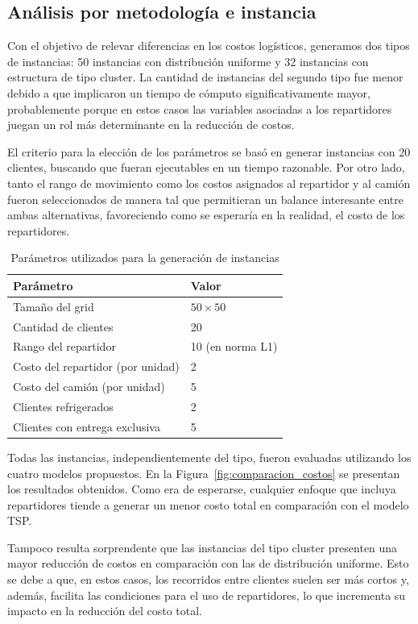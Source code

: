 \documentclass[10pt]{article}
\begin{document}
\subsection{Análisis por metodología e instancia}
Con el objetivo de relevar diferencias en los costos logísticos, generamos dos tipos de instancias: 50 instancias con distribución uniforme y 32 instancias con estructura de tipo cluster. La cantidad de instancias del segundo tipo fue menor debido a que implicaron un tiempo de cómputo significativamente mayor, probablemente porque en estos casos las variables asociadas a los repartidores juegan un rol más determinante en la reducción de costos.

El criterio para la elección de los parámetros se basó en generar instancias con 20 clientes, buscando que fueran ejecutables en un tiempo razonable. Por otro lado, tanto el rango de movimiento como los costos asignados al repartidor y al camión fueron seleccionados de manera tal que permitieran un balance interesante entre ambas alternativas, favoreciendo como se esperaría en la realidad, el costo de los repartidores.
\clearpage

\begin{table}[htbp]
	\centering
	\begin{tabular}{ll}
		\hline
		\textbf{Parámetro} & \textbf{Valor} \\
		\hline
		Tamaño del grid & $50 \times 50$ \\
		Cantidad de clientes & 20 \\
		Rango del repartidor & 10 (en norma L1) \\
		Costo del repartidor (por unidad) & 2 \\
		Costo del camión (por unidad) & 5 \\
		Clientes refrigerados & 2 \\
		Clientes con entrega exclusiva & 5 \\
		\hline
	\end{tabular}
	\caption{Parámetros utilizados para la generación de instancias}
	\label{tab:parametros_instancias}
\end{table}


Todas las instancias, independientemente del tipo, fueron evaluadas utilizando los cuatro modelos propuestos. En la Figura~\ref{fig:comparacion_costos} se presentan los resultados obtenidos. Como era de esperarse, cualquier enfoque que incluya repartidores tiende a generar un menor costo total en comparación con el modelo TSP.

Tampoco resulta sorprendente que las instancias del tipo cluster presenten una mayor reducción de costos en comparación con las de distribución uniforme. Esto se debe a que, en estos casos, los recorridos entre clientes suelen ser más cortos y, además, facilita las condiciones para el uso de repartidores, lo que incrementa su impacto en la reducción del costo total.
\end{document}
